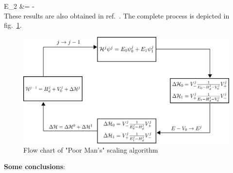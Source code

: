 \documentclass[12pt,twoside]{article}
\numberwithin{equation}{section}
\begin{document}
\Delta E_2 &= -\\
\eeq
These results are also obtained in ref.~\cite{hewson}. The complete process is depicted in fig.~\ref{pmsflow}.
\begin{figure}
    \centering
    \includegraphics[scale=0.34]{pms-flowchart.png}
    \caption{Flow chart of "Poor Man's" scaling algorithm}
    \label{pmsflow}
\end{figure}
\pb \textbf{Some conclusions}:
\end{document}
